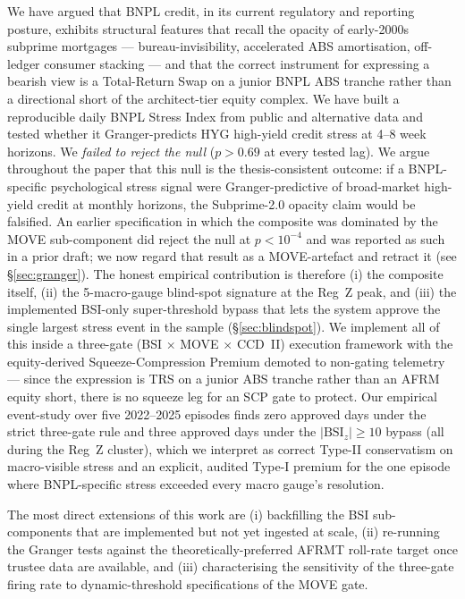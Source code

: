 \documentclass[11pt,letterpaper]{article}
\newcommand{\bsi}{\text{BSI}}
\begin{document}
We have argued that BNPL credit, in its current regulatory and
reporting posture, exhibits structural features that recall the
opacity of early-2000s subprime mortgages --- bureau-invisibility,
accelerated ABS amortisation, off-ledger consumer stacking --- and
that the correct instrument for expressing a bearish view is a
Total-Return Swap on a junior BNPL ABS tranche rather than a
directional short of the architect-tier equity complex. We have
built a reproducible daily BNPL Stress Index from public and
alternative data and tested whether it Granger-predicts HYG
high-yield credit stress at 4--8 week horizons. We
\emph{failed to reject the null} ($p > 0.69$ at every tested lag).
We argue throughout the paper that this null is the
thesis-consistent outcome: if a BNPL-specific psychological
stress signal were Granger-predictive of broad-market high-yield
credit at monthly horizons, the Subprime-2.0 opacity claim would
be falsified. An earlier specification in which the composite was
dominated by the MOVE sub-component did reject the null at
$p < 10^{-4}$ and was reported as such in a prior draft; we now
regard that result as a MOVE-artefact and retract it
(see \S\ref{sec:granger}). The honest empirical contribution is
therefore (i) the composite itself, (ii) the 5-macro-gauge
blind-spot signature at the Reg~Z peak, and (iii) the implemented
BSI-only super-threshold bypass that lets the system approve the
single largest stress event in the sample
(\S\ref{sec:blindspot}). We implement all of this inside a
three-gate (BSI $\times$ MOVE $\times$ CCD~II) execution framework
with the equity-derived Squeeze-Compression Premium demoted to
non-gating telemetry --- since the expression is TRS on a junior
ABS tranche rather than an AFRM equity short, there is no squeeze
leg for an SCP gate to protect. Our empirical event-study over
five 2022--2025 episodes finds zero approved days under the strict
three-gate rule and three approved days under the $|\bsi_z|\geq10$
bypass (all during the Reg~Z cluster), which we interpret as
correct Type-II conservatism on macro-visible stress and an
explicit, audited Type-I premium for the one episode where
BNPL-specific stress exceeded every macro gauge's resolution.

The most direct extensions of this work are (i) backfilling the
BSI sub-components that are implemented but not yet ingested at
scale, (ii) re-running the Granger tests against the
theoretically-preferred AFRMT roll-rate target once trustee data
are available, and (iii) characterising the sensitivity of the
three-gate firing rate to dynamic-threshold specifications of the
MOVE gate.
\end{document}
